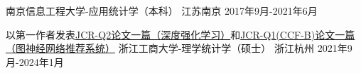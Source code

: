 \begin{educventries}
  \educventry
    {} %
    {南京信息工程大学-应用统计学（本科）} %
    {江苏南京} %
    {2017年9月-2021年6月} %

  \educventry
    {以第一作者发表\href{https://www.frontiersin.org/articles/10.3389/fbioe.2022.827408/full}{JCR-Q2论文一篇（深度强化学习）}和\href{https://www.sciencedirect.com/science/article/pii/S0020025523006497}{JCR-Q1(CCF-B)论文一篇（图神经网络推荐系统）}} %
    {浙江工商大学-理学统计学（硕士）} %
    {浙江杭州} %
    {2021年9月-2024年1月} %

\end{educventries}
